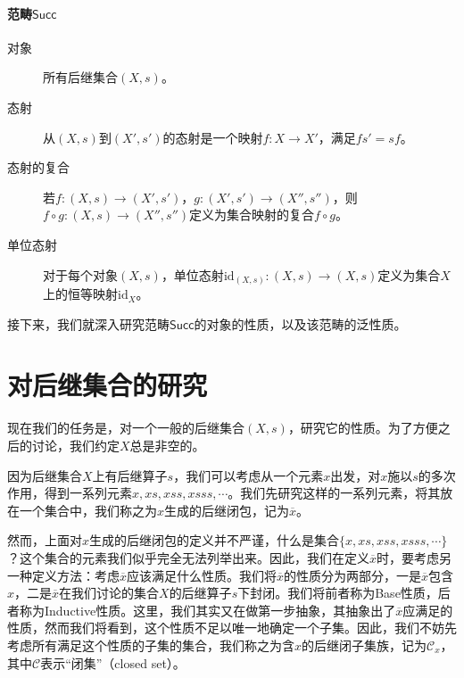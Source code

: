 \documentclass[oneside, 12pt]{ctexart}
\begin{document}
\paragraph{范畴$\mathsf{Succ}$}
\begin{description}
	\item[对象] 所有后继集合$(X, s)$。
	\item[态射] 从$(X, s)$到$(X', s')$的态射是一个映射$f \colon X \to X'$，满足$fs' = sf$。
	\item[态射的复合] 若$f \colon (X, s) \to (X', s')$，$g \colon (X', s') \to (X'', s'')$，则$f \circ g \colon (X, s) \to (X'', s'')$定义为集合映射的复合$f \circ g$。
	\item[单位态射] 对于每个对象$(X, s)$，单位态射$\text{id}_{(X, s)} \colon (X, s) \to (X, s)$定义为集合$X$上的恒等映射$\text{id}_X$。
\end{description}

接下来，我们就深入研究范畴$\mathsf{Succ}$的对象的性质，以及该范畴的泛性质。

\section{对后继集合的研究}

现在我们的任务是，对一个一般的后继集合$(X, s)$，研究它的性质。为了方便之后的讨论，我们约定$X$总是非空的。

因为后继集合$X$上有后继算子$s$，我们可以考虑从一个元素$x$出发，对$x$施以$s$的多次作用，得到一系列元素$x, xs, xss, xsss, \cdots$。我们先研究这样的一系列元素，将其放在一个集合中，我们称之为$x$生成的后继闭包，记为$\overline{x}$。

然而，上面对$x$生成的后继闭包的定义并不严谨，什么是集合$\{x, xs, xss, xsss, \cdots\}$？这个集合的元素我们似乎完全无法列举出来。因此，我们在定义$\overline{x}$时，要考虑另一种定义方法：考虑$\overline{x}$应该满足什么性质。我们将$\overline{x}$的性质分为两部分，一是$\overline{x}$包含$x$，二是$\overline{x}$在我们讨论的集合$X$的后继算子$s$下封闭。我们将前者称为Base性质，后者称为Inductive性质。这里，我们其实又在做第一步抽象，其抽象出了$\overline{x}$应满足的性质，然而我们将看到，这个性质不足以唯一地确定一个子集。因此，我们不妨先考虑所有满足这个性质的子集的集合，我们称之为含$x$的后继闭子集族，记为$\mathcal{C}_x$，其中$\mathcal{C}$表示“闭集”（closed set）。
\end{document}
